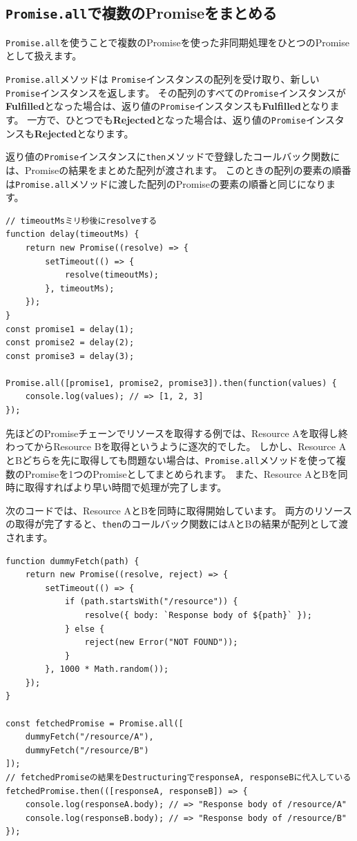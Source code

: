 \hypertarget{promise-all}{%
\subsection{\texorpdfstring{\texttt{Promise.all}で複数のPromiseをまとめる}{Promise.allで複数のPromiseをまとめる}}\label{promise-all}}

\texttt{Promise.all}を使うことで複数のPromiseを使った非同期処理をひとつのPromiseとして扱えます。

\texttt{Promise.all}メソッドは
\texttt{Promise}インスタンスの配列を受け取り、新しい\texttt{Promise}インスタンスを返します。
その配列のすべての\texttt{Promise}インスタンスが\textbf{Fulfilled}となった場合は、返り値の\texttt{Promise}インスタンスも\textbf{Fulfilled}となります。
一方で、ひとつでも\textbf{Rejected}となった場合は、返り値の\texttt{Promise}インスタンスも\textbf{Rejected}となります。

返り値の\texttt{Promise}インスタンスに\texttt{then}メソッドで登録したコールバック関数には、Promiseの結果をまとめた配列が渡されます。
このときの配列の要素の順番は\texttt{Promise.all}メソッドに渡した配列のPromiseの要素の順番と同じになります。

\begin{lstlisting}
// timeoutMsミリ秒後にresolveする
function delay(timeoutMs) {
    return new Promise((resolve) => {
        setTimeout(() => {
            resolve(timeoutMs);
        }, timeoutMs);
    });
}
const promise1 = delay(1);
const promise2 = delay(2);
const promise3 = delay(3);

Promise.all([promise1, promise2, promise3]).then(function(values) {
    console.log(values); // => [1, 2, 3]
});
\end{lstlisting}

先ほどのPromiseチェーンでリソースを取得する例では、Resource
Aを取得し終わってからResource Bを取得というように逐次的でした。
しかし、Resource
AとBどちらを先に取得しても問題ない場合は、\texttt{Promise.all}メソッドを使って複数のPromiseを1つのPromiseとしてまとめられます。
また、Resource AとBを同時に取得すればより早い時間で処理が完了します。

次のコードでは、Resource AとBを同時に取得開始しています。
両方のリソースの取得が完了すると、\texttt{then}のコールバック関数にはAとBの結果が配列として渡されます。

\begin{lstlisting}
function dummyFetch(path) {
    return new Promise((resolve, reject) => {
        setTimeout(() => {
            if (path.startsWith("/resource")) {
                resolve({ body: `Response body of ${path}` });
            } else {
                reject(new Error("NOT FOUND"));
            }
        }, 1000 * Math.random());
    });
}

const fetchedPromise = Promise.all([
    dummyFetch("/resource/A"),
    dummyFetch("/resource/B")
]);
// fetchedPromiseの結果をDestructuringでresponseA, responseBに代入している
fetchedPromise.then(([responseA, responseB]) => {
    console.log(responseA.body); // => "Response body of /resource/A"
    console.log(responseB.body); // => "Response body of /resource/B"
});
\end{lstlisting}

